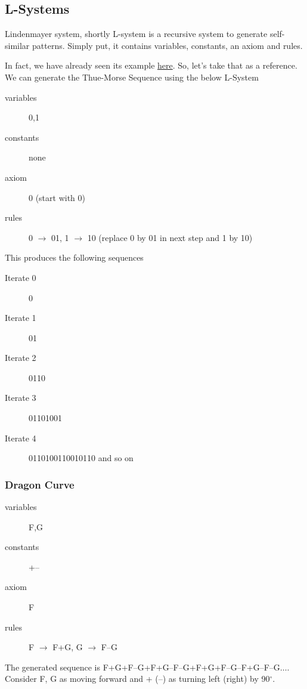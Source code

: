 \documentclass[../../Problems]{subfiles}
\begin{document}
\subsection{L-Systems}{\label{pp:lsystems}}
Lindenmayer system, shortly L-system is a recursive system to generate self-similar patterns.
Simply put, it contains variables, constants, an axiom and rules.

In fact, we have already seen its example \hyperref[pp:thuemorsesequence]{here}. So, let's take that as a reference. We can generate the Thue-Morse Sequence using the below L-System
\begin{description}
	\item[variables] 0,1
	\item[constants] none
	\item[axiom] 0 (start with 0)
	\item[rules] 0 $\rightarrow$ 01, 1 $\rightarrow$ 10 (replace 0 by 01 in next step and 1 by 10)
\end{description}
This produces the following sequences
\begin{description}
	\item[Iterate 0] 0
	\item[Iterate 1] 01
	\item[Iterate 2] 0110
	\item[Iterate 3] 01101001
	\item[Iterate 4] 0110100110010110 and so on
\end{description}
\subsubsection{Dragon Curve}{\label{pp:dragoncurve}}
\begin{description}
	\item[variables] F,G
	\item[constants] +--
	\item[axiom] F
	\item[rules] F $\rightarrow$ F+G, G $\rightarrow$ F--G
\end{description}
The generated sequence is F+G+F--G+F+G--F--G+F+G+F--G--F+G--F--G$\ldots$. Consider F, G as moving forward and + (--) as turning left (right) by 90$^\circ$.
\end{document}
